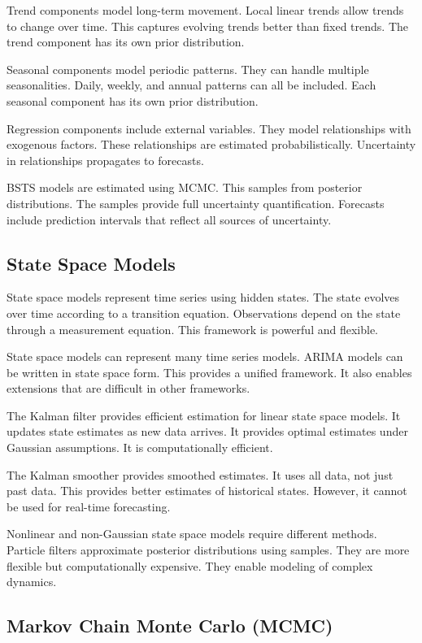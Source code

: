 Trend components model long-term movement. Local linear trends allow trends to change over time. This captures evolving trends better than fixed trends. The trend component has its own prior distribution.

Seasonal components model periodic patterns. They can handle multiple seasonalities. Daily, weekly, and annual patterns can all be included. Each seasonal component has its own prior distribution.

Regression components include external variables. They model relationships with exogenous factors. These relationships are estimated probabilistically. Uncertainty in relationships propagates to forecasts.

BSTS models are estimated using MCMC. This samples from posterior distributions. The samples provide full uncertainty quantification. Forecasts include prediction intervals that reflect all sources of uncertainty.

\subsection{State Space Models}

State space models represent time series using hidden states. The state evolves over time according to a transition equation. Observations depend on the state through a measurement equation. This framework is powerful and flexible.

State space models can represent many time series models. ARIMA models can be written in state space form. This provides a unified framework. It also enables extensions that are difficult in other frameworks.

The Kalman filter provides efficient estimation for linear state space models. It updates state estimates as new data arrives. It provides optimal estimates under Gaussian assumptions. It is computationally efficient.

The Kalman smoother provides smoothed estimates. It uses all data, not just past data. This provides better estimates of historical states. However, it cannot be used for real-time forecasting.

Nonlinear and non-Gaussian state space models require different methods. Particle filters approximate posterior distributions using samples. They are more flexible but computationally expensive. They enable modeling of complex dynamics.

\subsection{Markov Chain Monte Carlo (MCMC)}

